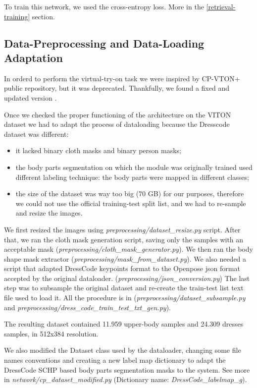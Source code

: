 To train this network, we used the cross-entropy loss. More in the \ref{retrieval-training} section.



\subsection{Data-Preprocessing and Data-Loading Adaptation}
In orderd to perform the virtual-try-on task we were inspired by CP-VTON+ \cite{CP-VTON+} public repository, but it was deprecated. Thankfully, we found a fixed and updated version \cite{ARajgor}.


Once we checked the proper functioning of the architecture on the VITON dataset we had to adapt the process of dataloading because the Dresscode dataset was different:
\begin{itemize}
\item it lacked binary cloth masks and binary person masks;
\item the body parts segmentation on which the module was originally trained used different labeling technique: the body parts were mapped in different classes;
\item the size of the dataset was way too big (70 GB) for our purposes, therefore we could not use the official training-test split list, and we had to re-sample and resize the images.
\end{itemize}

We first resized the images using \textit{preprocessing/dataset\_resize.py} script. 
After that, we ran the cloth mask generation script, saving only the samples with an acceptable mask (\textit{preprocessing/cloth\_mask\_generator.py}).
We then ran the body shape mask extractor (\textit{preprocessing/mask\_from\_dataset.py}).
We also needed a script that adapted DressCode keypoints format to the Openpose json format accepted by the original dataloader. (\textit{preprocessing/json\_conversion.py})
The last step was to subsample the original dataset and re-create the train-test list text file used to load it. All the procedure is in (\textit{preprocessing/dataset\_subsample.py} and \textit{preprocessing/dress\_code\_train\_test\_txt\_gen.py}).

The resulting dataset contained 11.959 upper-body samples and 24.309 dresses samples, in 512x384 resolution. 

We also modified the Dataset class used by the dataloader, changing some file names conventions and creating a new label map dictionary to adapt the DressCode SCHP based body parts segmentation masks to the system. See more in \textit{network/cp\_dataset\_modified.py} (Dictionary name: \textit{DressCode\_labelmap\_g}).

